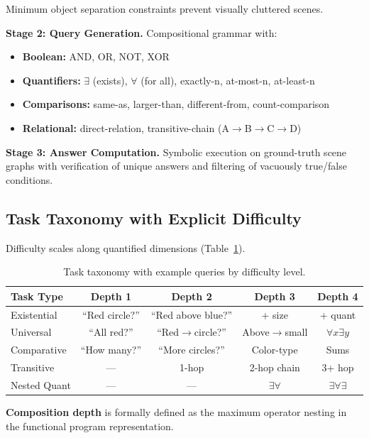 \documentclass[11pt,a4paper]{article}
\begin{document}
Minimum object separation constraints prevent visually cluttered scenes.

\textbf{Stage 2: Query Generation.} Compositional grammar with:
\begin{itemize}
    \item \textbf{Boolean:} AND, OR, NOT, XOR
    \item \textbf{Quantifiers:} $\exists$ (exists), $\forall$ (for all), exactly-n, at-most-n, at-least-n
    \item \textbf{Comparisons:} same-as, larger-than, different-from, count-comparison
    \item \textbf{Relational:} direct-relation, transitive-chain (A$\rightarrow$B$\rightarrow$C$\rightarrow$D)
\end{itemize}

\textbf{Stage 3: Answer Computation.} Symbolic execution on ground-truth scene graphs with verification of unique answers and filtering of vacuously true/false conditions.

\subsection{Task Taxonomy with Explicit Difficulty}

Difficulty scales along quantified dimensions (Table~\ref{tab:difficulty}).

\begin{table}[t]
\caption{Task taxonomy with example queries by difficulty level.}
\label{tab:difficulty}
\centering
\small
\begin{tabular}{lcccc}
\toprule
\textbf{Task Type} & \textbf{Depth 1} & \textbf{Depth 2} & \textbf{Depth 3} & \textbf{Depth 4} \\
\midrule
Existential & ``Red circle?'' & ``Red above blue?'' & + size & + quant \\
Universal & ``All red?'' & ``Red$\rightarrow$circle?'' & Above$\rightarrow$small & $\forall x \exists y$ \\
Comparative & ``How many?'' & ``More circles?'' & Color-type & Sums \\
Transitive & --- & 1-hop & 2-hop chain & 3+ hop \\
Nested Quant & --- & --- & $\exists\forall$ & $\exists\forall\exists$ \\
\bottomrule
\end{tabular}
\end{table}

\textbf{Composition depth} is formally defined as the maximum operator nesting in the functional program representation.
\end{document}
